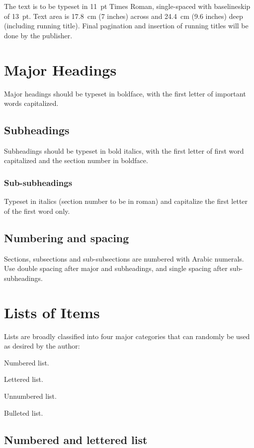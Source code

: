 \documentclass{ws-ijbc}
\begin{document}
The text is to be typeset in 11~pt Times \hbox{Roman},
single-spaced with baselineskip of 13~pt. Text area is 17.8~cm (7
inches) across and 24.4~cm (9.6 inches) deep (including running
title). Final pagination and insertion of running titles will be
done by the publisher.

\section{Major Headings}
Major headings should be typeset in boldface, with the first
letter of important words capitalized.

\subsection{Subheadings}
Subheadings should be typeset in bold italics, with the first
letter of first word capitalized and the section number in
boldface.

\subsubsection{Sub-subheadings}
Typeset in italics (section number to be in roman) and capitalize
the first letter of the first word only.

\subsection{Numbering and spacing}
Sections, subsections and sub-subsections are numbered with Arabic
numerals. Use double spacing after major and subheadings, and
single spacing after sub-subheadings.

\section{Lists of Items}
Lists are broadly classified into four major categories that can
randomly be used as desired by the author:
\begin{alphlist}[(d)]
\item Numbered list.
\item Lettered list.
\item Unnumbered list.
\item Bulleted list.
\end{alphlist}

\subsection{Numbered and lettered list}
\end{document}
